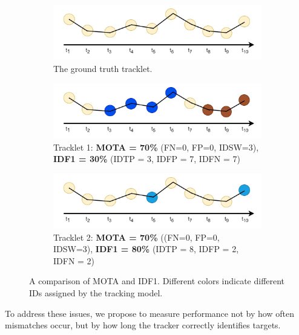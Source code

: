 \begin{figure}[H]
    \centering
    \begin{subfigure}[b]{\textwidth}
        \centering
        \includegraphics[width=\linewidth]{figures/chapter_tracking/IDSW_gt.jpg}
        \caption{The ground truth tracklet.}
        \label{fig:track_idf1_gt} 
    \end{subfigure}
    \begin{subfigure}[b]{\textwidth}
        \centering
        \includegraphics[width=\linewidth]{figures/chapter_tracking/IDSW_track_1.jpg}
        \caption{Tracklet 1: \textbf{MOTA = 70\%} (FN=0, FP=0, IDSW=3), \textbf{IDF1 = 30\%} (IDTP = 3, IDFP = 7, IDFN = 7) }
        \label{fig:track_idf1_track_1}
    \end{subfigure}
    \begin{subfigure}[b]{\textwidth}
        \centering
        \includegraphics[width=\linewidth]{figures/chapter_tracking/IDSW_track_2.jpg}
        \caption{Tracklet 2: \textbf{MOTA = 70\%} ((FN=0, FP=0, IDSW=3), \textbf{IDF1 = 80\%} (IDTP = 8, IDFP = 2, IDFN = 2)}
        \label{fig:track_idf1_track_2}
    \end{subfigure}
  \caption{A comparison of MOTA and IDF1. Different colors indicate different IDs assigned by the tracking model.}
  \label{fig:tracking_idf1}
\end{figure}

To address these issues, we propose to measure performance not by how often mismatches occur, but by how long the tracker correctly identifies targets.

